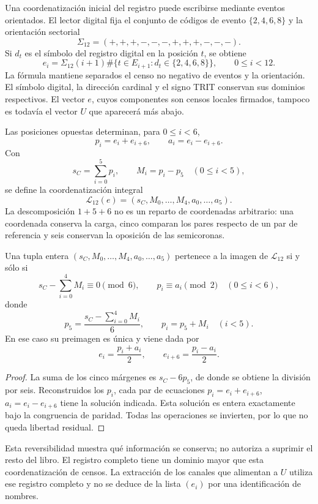 Una coordenatización inicial del registro puede escribirse mediante eventos
orientados. El lector digital fija el conjunto de códigos de evento
\(\{2,4,6,8\}\) y la orientación sectorial
\[
 \Sigma_{12}=(+,+,+,-,-,-,+,+,+,-,-,-).
\]
Si \(d_t\) es el símbolo del registro digital en la posición \(t\), se obtiene
\[
 e_i=\Sigma_{12}(i+1)
 \#\{t\in E_{i+1}:d_t\in\{2,4,6,8\}\},
 \qquad0\leq i<12.
\]
La fórmula mantiene separados el censo no negativo de eventos y la
orientación. El símbolo digital, la dirección cardinal y el signo TRIT
conservan sus dominios respectivos. El
vector \(e\), cuyos componentes son censos locales firmados, tampoco es
todavía el vector \(U\) que aparecerá más abajo.

Las posiciones opuestas determinan, para \(0\leq i<6\),
\[
 p_i=e_i+e_{i+6},\qquad a_i=e_i-e_{i+6}.
\]
Con
\[
 s_C=\sum_{i=0}^{5}p_i,\qquad M_i=p_i-p_5\quad(0\leq i<5),
\]
se define la coordenatización integral
\[
 \mathcal L_{12}(e)
 =(s_C,M_0,\ldots,M_4,a_0,\ldots,a_5).
\]
La descomposición \(1+5+6\) no es un reparto de coordenadas arbitrario:
una coordenada conserva la carga, cinco comparan los pares respecto de un
par de referencia y seis conservan la oposición de las semicoronas.

\begin{lemma}
\label{lem:k-carta-integral}
Una tupla entera \((s_C,M_0,\ldots,M_4,a_0,\ldots,a_5)\) pertenece a la
imagen de \(\mathcal L_{12}\) si y sólo si
\[
 s_C-\sum_{i=0}^{4}M_i\equiv0\pmod6,
 \qquad p_i\equiv a_i\pmod2\quad(0\leq i<6),
\]
donde
\[
 p_5=\frac{s_C-\sum_{i=0}^{4}M_i}{6},\qquad p_i=p_5+M_i\quad(i<5).
\]
En ese caso su preimagen es única y viene dada por
\[
 e_i=\frac{p_i+a_i}{2},\qquad e_{i+6}=\frac{p_i-a_i}{2}.
\]
\end{lemma}

\begin{proof}
La suma de los cinco márgenes es \(s_C-6p_5\), de donde se obtiene la
división por seis. Reconstruidos los \(p_i\), cada par de ecuaciones
\(p_i=e_i+e_{i+6}\), \(a_i=e_i-e_{i+6}\) tiene la solución indicada.
Esta solución es entera exactamente bajo la congruencia de paridad. Todas
las operaciones se invierten, por lo que no queda libertad residual.
\end{proof}

Esta reversibilidad muestra qué información se conserva; no autoriza a
suprimir el resto del libro. El registro completo tiene un dominio mayor
que esta coordenatización de censos. La extracción de los canales que alimentan a
\(U\) utiliza ese registro completo y no se deduce de la lista
\((e_i)\) por una identificación de nombres.

